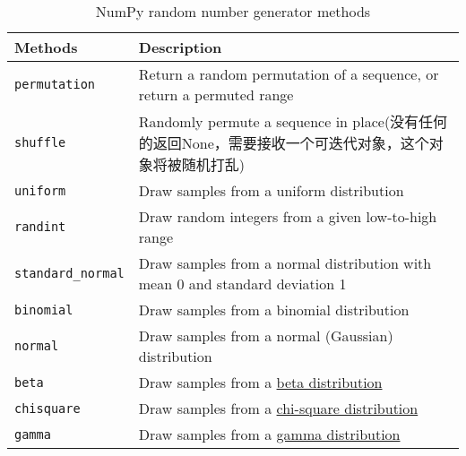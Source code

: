 \begin{table}
    \caption{NumPy random number generator methods}
    \label{NumPy random number generator methods}
    \begin{tabularx}{\textwidth}{lX}
        \hline
        Methods                & Description                                                                  \\
        \hline
        \verb|permutation|     & Return a random permutation of a sequence, or return a permuted range        \\
        \verb|shuffle|         & Randomly permute a sequence in place(没有任何的返回None，需要接收一个可迭代对象，这个对象将被随机打乱)                                         \\
        \verb|uniform|         & Draw samples from a uniform distribution                                     \\
        \verb|randint|         & Draw random integers from a given low-to-high range                          \\
        \verb|standard_normal| & Draw samples from a normal distribution with mean 0 and standard deviation 1 \\
        \verb|binomial|        & Draw samples from a binomial distribution                                    \\
        \verb|normal|          & Draw samples from a normal (Gaussian) distribution                           \\
        \verb|beta|            & Draw samples from a \href{https://numpy.org/doc/stable/reference/random/generated/numpy.random.beta.html}{beta distribution}                                        \\                                    
        \verb|chisquare|       & Draw samples from a \href{https://numpy.org/doc/stable/reference/random/generated/numpy.random.chisquare.html}{chi-square distribution}                                  \\
        \verb|gamma|           & Draw samples from a \href{https://numpy.org/doc/stable/reference/random/generated/numpy.random.gamma.html}{gamma distribution}                                       \\
        \hline
    \end{tabularx}
\end{table}
